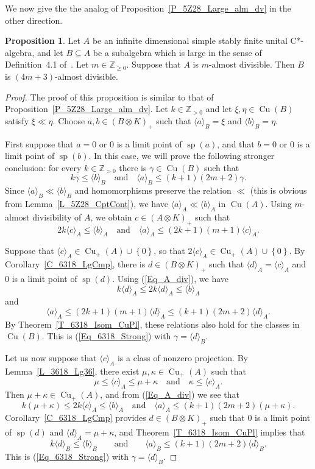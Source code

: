 \documentclass[10pt]{amsart}
\numberwithin{equation}{section}
\theoremstyle{definition}
\newtheorem{prp}[thm]{Proposition}
\newcommand{\gm}{\gamma}
\newcommand{\et}{\eta}
\newcommand{\kp}{\kappa}
\newcommand{\N}{{\mathbb{Z}}_{> 0}}
\newcommand{\Nz}{{\mathbb{Z}}_{\geq 0}}
\newcommand{\spec}{{\operatorname{sp}}}
\newcommand{\Cu}{{\operatorname{Cu}}}
\newcommand{\andeqn}{\qquad {\mbox{and}} \qquad}
\newcommand{\uca}{unital C*-algebra}
\newcommand{\hm}{homomorphism}
\renewcommand{\S}{\subseteq}
\newcommand{\set}[1]{\left\{ #1 \right\}}
\newcommand{\cc}[1]{\langle #1 \rangle}
\newcommand{\ccA}[1]{\langle #1 \rangle_A}
\begin{document}
We now give the the analog of
Proposition~\ref{P_5Z28_Large_alm_dv} in the other direction.

\begin{prp}\label{P_5Z28_Large_alm_dv_C}
Let $A$ be an infinite dimensional simple stably finite \uca,
and let $B \S A$ be a subalgebra which is large in the sense
of Definition~4.1 of~\cite{Phl40}.
Let $m \in \Nz$.
Suppose that $A$ is $m$-almost divisible.
Then $B$ is $(4 m + 3)$-almost divisible.
\end{prp}

\begin{proof}
The proof of this proposition is similar to
that of Proposition~\ref{P_5Z28_Large_alm_dv}.
Let $k \in \N$ and let $\xi, \et \in \Cu (B)$ satisfy
$\xi \ll \et$.
Choose $a, b \in (B \otimes K)_{+}$
such that $\cc{a}_B = \xi$ and $\cc{b}_B = \et$.

First suppose that $a = 0$ or $0$ is a limit point of
$\spec (a)$, and that $b = 0$ or $0$ is a limit point of $\spec (b)$.
In this case, we will prove the following stronger conclusion:
for every $k \in \N$ there is $\gm \in \Cu (B)$ such that
%
\begin{equation}\label{Eq_6318_Strong}
k \gm \leq \cc{b}_B \quad \text{and} \quad
\cc{a}_B \leq (k + 1) (2 m + 2) \gm.
\end{equation}
%
Since $\cc{a}_B \ll \cc{b}_B$ and \hm{s} preserve the
relation $\ll$ (this is obvious from Lemma~\ref{L_5Z28_CptCont}),
we have $\cc{a}_A \ll \cc{b}_A$ in $\Cu (A)$.
Using $m$-almost divisibility of $A$, we obtain
$c\in (A \otimes K)_{+}$ such that
%
\begin{equation}\label{Eq_A_div}
2 k \cc{c}_A \leq \cc{b}_A \quad \text{and} \quad
\cc{a}_A \leq (2 k + 1) (m + 1) \cc{c}_A.
\end{equation}

Suppose that $\cc{c}_A \in \Cu_{+}(A) \cup \set{0}$,
so that $2 \cc{c}_A \in \Cu_{+} (A) \cup \set{0}$.
By Corollary~\ref{C_6318_LgCmp}, there is $d \in (B \otimes K)_{+}$
such that $\ccA{d} = \ccA{c}$ and $0$ is a limit point of $\spec (d)$.
Using (\ref{Eq_A_div}), we have
%
\[
k \cc{d}_A \leq 2 k \cc{d}_A \leq \cc{b}_A
\]
and
\[
\cc{a}_A \leq (2 k + 1) (m + 1) \cc{d}_A
         \leq (k + 1) (2 m + 2) \cc{d}_A.
\]
%
By Theorem~\ref{T_6318_Isom_CuPl}, these relations
also hold for the classes in $\Cu (B)$.
This is (\ref{Eq_6318_Strong}) with $\gm = \cc{d}_B$.

Let us now suppose that $\cc{c}_A$ is a class of nonzero projection.
By Lemma~\ref{L_3618_Lg36}, there exist
$\mu, \kp \in \Cu_{+} (A)$ such that
\[
\mu \leq \cc{c}_A \leq \mu + \kp \quad \text{and}
\quad \kp \leq \cc{c}_A.
\]
Then $\mu + \kp \in \Cu_{+} (A)$, and from (\ref{Eq_A_div})
we see that
%
\[
k (\mu + \kp) \leq 2 k \cc{c}_A \leq \cc{b}_A \quad
\text{and} \quad \cc{a}_A \leq (k + 1) (2 m +2) (\mu + \kp).
\]
%
Corollary~\ref{C_6318_LgCmp} provides
$d \in (B \otimes K)_{+}$ such that $0$ is a limit point of $\spec(d)$
and $\cc{d}_A = \mu + \kp$, and Theorem~\ref{T_6318_Isom_CuPl} implies that
\[
k \cc{d}_B \leq \cc{b}_B
\andeqn
\cc{a}_B \leq (k + 1) (2 m + 2) \cc{d}_B.
\]
This is (\ref{Eq_6318_Strong}) with $\gm = \cc{d}_B$.


\end{proof}
\end{document}
